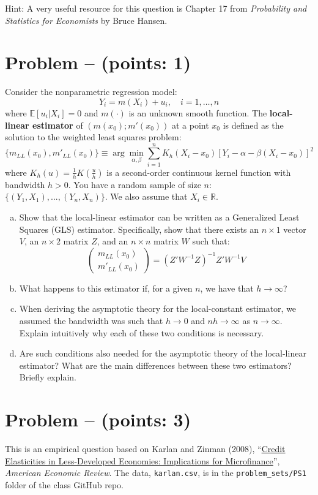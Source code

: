 \documentclass[11pt]{article}
\theoremstyle{definition}
\newcommand{\E}{\mathbb{E}}
\newcounter{problem}
\renewcommand{\theproblem}{\arabic{problem}}
\newcommand{\problem}[1]{
	\stepcounter{problem}
	\section*{Problem \theproblem{} -- (points: #1)}
}
\begin{document}
Hint: A very useful resource for this question is Chapter 17 from \textit{Probability and Statistics for Economists} by Bruce Hansen.

\problem{1}
Consider the nonparametric regression model:
\[
Y_i = m(X_i) + u_i, \quad i = 1, \ldots, n
\]
where $\E[u_i|X_i] = 0$ and $m(\cdot)$ is an unknown smooth function. The \textbf{local-linear estimator} of $(m(x_0); m'(x_0))$ at a point $x_0$ is defined as the solution to the weighted least squares problem:
\[
\{m_{LL}(x_0), m'_{LL}(x_0)\} \equiv \arg\min_{\alpha, \beta} \sum_{i=1}^{n} K_h(X_i - x_0) \left[Y_i - \alpha - \beta(X_i - x_0)\right]^2
\]
where $K_h(u) = \frac{1}{h}K\left(\frac{u}{h}\right)$ is a second-order continuous kernel function with bandwidth $h > 0$. You have a random sample of size $n$: $\{(Y_1, X_1), ..., (Y_n, X_n)\}$. We also assume that $X_i \in \mathbb{R}$.

\begin{enumerate}[a)]
	\item Show that the local-linear estimator can be written as a Generalized Least Squares (GLS) estimator. Specifically, show that there exists an $n\times 1$ vector $V$, an $n\times 2$ matrix $Z$, and an $n\times n$ matrix $W$ such that:
	\[\begin{pmatrix}m_{LL}(x_0) \\ m'_{LL}(x_0)\end{pmatrix} = (Z' W^{-1} Z)^{-1} Z' W^{-1} V\]

	\item What happens to this estimator if, for a given $n$, we have that $h \to \infty$?

	\item When deriving the asymptotic theory for the local-constant estimator, we assumed the bandwidth was such that $h\to 0$ and $nh \to \infty$ as $n \to \infty$. Explain intuitively why each of these two conditions is necessary.

	\item Are such conditions also needed for the asymptotic theory of the local-linear estimator? What are the main differences between these two estimators? Briefly explain.
\end{enumerate}

\problem{3}
This is an empirical question based on Karlan and Zinman (2008), ``\href{https://doi.org/10.1257/aer.98.3.1040}{Credit Elasticities in Less-Developed Economies: Implications for Microfinance}'', \textit{American Economic Review}. The data, \texttt{karlan.csv}, is in the \texttt{problem\_sets/PS1} folder of the class GitHub repo.
\end{document}
